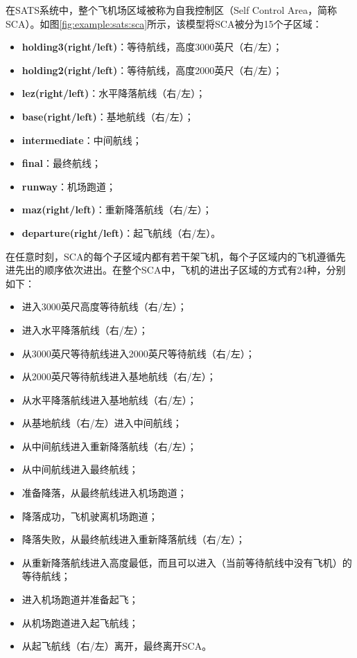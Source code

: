在SATS系统中，整个飞机场区域被称为自我控制区（Self Control Area，简称SCA）。如图\ref{fig:example:sats:sca}所示，该模型将SCA被分为15个子区域：
\begin{itemize}
	\item \textbf{holding3(right/left)}：等待航线，高度3000英尺（右/左）；
	\item \textbf{holding2(right/left)}：等待航线，高度2000英尺（右/左）；
	\item \textbf{lez(right/left)}：水平降落航线（右/左）；
	\item \textbf{base(right/left)}：基地航线（右/左）；
	\item \textbf{intermediate}：中间航线；
	\item \textbf{final}：最终航线；
	\item \textbf{runway}：机场跑道；
	\item \textbf{maz(right/left)}：重新降落航线（右/左）；
	\item \textbf{departure(right/left)}：起飞航线（右/左）。
\end{itemize}
在任意时刻，SCA的每个子区域内都有若干架飞机，每个子区域内的飞机遵循先进先出的顺序依次进出。在整个SCA中，飞机的进出子区域的方式有24种，分别如下：
\begin{itemize}
	\item 进入3000英尺高度等待航线（右/左）；
	\item 进入水平降落航线（右/左）；
	\item 从3000英尺等待航线进入2000英尺等待航线（右/左）；
	\item 从2000英尺等待航线进入基地航线（右/左）；
	\item 从水平降落航线进入基地航线（右/左）；
	\item 从基地航线（右/左）进入中间航线；
	\item 从中间航线进入重新降落航线（右/左）；
	\item 从中间航线进入最终航线；
	\item 准备降落，从最终航线进入机场跑道；
	\item 降落成功，飞机驶离机场跑道；
	\item 降落失败，从最终航线进入重新降落航线（右/左）；
	\item 从重新降落航线进入高度最低，而且可以进入（当前等待航线中没有飞机）的等待航线；
	\item 进入机场跑道并准备起飞；
	\item 从机场跑道进入起飞航线；
	\item 从起飞航线（右/左）离开，最终离开SCA。
\end{itemize}
